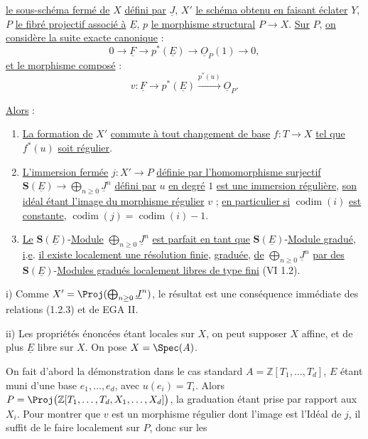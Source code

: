 
\uline{le sous-schéma fermé de} \(X\) \uline{défini par} \(\underline{J}\), \(X'\) \uline{le schéma obtenu en faisant éclater} \(Y\), \(P\) \uline{le fibré projectif associé à} \(\underline{E}\), \(p\) \uline{le morphisme structural} \(P\to X\). \uline{Sur} \(P\), \uline{on considère la suite exacte canonique} :
\[
0\to \underline{F}\to p^*(\underline{E})\to\underline{O}_P(1)\to0,
\]
\uline{et le morphisme composé} :
\[
 v:\underline{F}\longrightarrow p^*(\underline{E})\xrightarrow{p^*(u)}\underline{O}_P .
\]

\uline{Alors} :
\begin{enumerate}[label=\roman*)]
\item \uline{La formation de} \(X'\) \uline{commute à tout changement de base} \(f:T\to X\) \uline{tel que} \(f^*(u)\) \uline{soit régulier}.
\item \uline{L'immersion fermée} \(j:X'\to P\) \uline{définie par l'homomorphisme surjectif} \(\mathbf{S}(\underline{E})\longrightarrow\bigoplus_{n\ge0}\underline{J}^n\) \uline{défini par} \(u\) \uline{en degré} \(1\) \uline{est une immersion régulière}, \uline{son idéal étant l'image du morphisme régulier} \(v\) ; \uline{en particulier si} \(\operatorname{codim}(i)\) \uline{est constante}, \(\operatorname{codim}(j)=\operatorname{codim}(i)-1\).
\item \uline{Le} \(\mathbf{S}(\underline{E})\)-\uline{Module} \(\bigoplus_{n\ge0}\underline{J}^n\) \uline{est parfait en tant que} \(\mathbf{S}(\underline{E})\)-\uline{Module gradué}, \uline{i}.\uline{e}. \uline{il existe localement une résolution finie}, \uline{graduée}, \uline{de} \(\bigoplus_{n\ge0}\underline{J}^n\) \uline{par des} \(\mathbf{S}(\underline{E})\)-\uline{Modules gradués localement libres de type fini} (VI 1.2).
\end{enumerate}

i) Comme \(X'=\Proj(\bigoplus_{n\ge0}\underline{J}^n)\), le résultat est une conséquence immédiate des relations (1.2.3) et de EGA II.

ii) Les propriétés énoncées étant locales sur \(X\), on peut supposer \(X\) affine, et de plus \(\underline{E}\) libre sur \(X\). On pose \(X=\Spec(A)\).

On fait d'abord la démonstration dans le cas standard \(A=\mathbb Z[T_1,\ldots,T_d]\), \(E\) étant muni d'une base \(e_1,\ldots,e_d\), avec \(u(e_i)=T_i\). Alors \(P=\Proj\bigl(\mathbb Z[T_1,\ldots,T_d,X_1,\ldots,X_d]\bigr)\), la graduation étant prise par rapport aux \(X_i\). Pour montrer que \(v\) est un morphisme régulier dont l'image est l'Idéal de \(j\), il suffit de le faire localement sur \(P\), donc sur les
